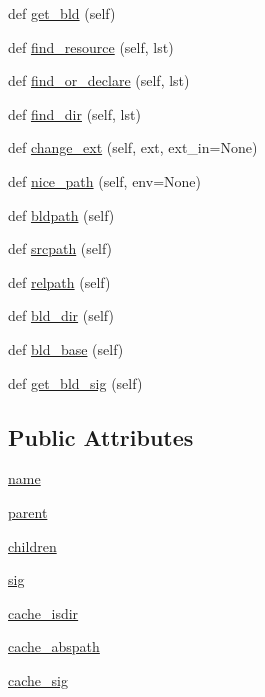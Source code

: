 \begin{DoxyCompactItemize}
\item 
def \hyperlink{classwaflib_1_1_node_1_1_node_a181e1ee8473df6b270153d1b071d4dc0}{get\+\_\+bld} (self)
\item 
def \hyperlink{classwaflib_1_1_node_1_1_node_a72b22d40cbdffb458638abb21d706ff8}{find\+\_\+resource} (self, lst)
\item 
def \hyperlink{classwaflib_1_1_node_1_1_node_aca7db00cba3cae363d3b5f689ce10828}{find\+\_\+or\+\_\+declare} (self, lst)
\item 
def \hyperlink{classwaflib_1_1_node_1_1_node_a6b0cb5708818ef6483466202ece39049}{find\+\_\+dir} (self, lst)
\item 
def \hyperlink{classwaflib_1_1_node_1_1_node_ad8e6f438a9b4e34994c8ef82c3b7649d}{change\+\_\+ext} (self, ext, ext\+\_\+in=None)
\item 
def \hyperlink{classwaflib_1_1_node_1_1_node_a84dd8d16929674c2a4dadcc078d9d314}{nice\+\_\+path} (self, env=None)
\item 
def \hyperlink{classwaflib_1_1_node_1_1_node_a1e67abe7b66ef0abd91795547e14a7b7}{bldpath} (self)
\item 
def \hyperlink{classwaflib_1_1_node_1_1_node_a135bd20c340d064fb59d2c8f329fec50}{srcpath} (self)
\item 
def \hyperlink{classwaflib_1_1_node_1_1_node_a4bc57e86dc18da4ce8fc9a669a829186}{relpath} (self)
\item 
def \hyperlink{classwaflib_1_1_node_1_1_node_ae2103a3fade78458d40298173d7179a3}{bld\+\_\+dir} (self)
\item 
def \hyperlink{classwaflib_1_1_node_1_1_node_a56b26245067bfe835f32199e74135a8a}{bld\+\_\+base} (self)
\item 
def \hyperlink{classwaflib_1_1_node_1_1_node_a804270edff72f7bc520841fa60a494e4}{get\+\_\+bld\+\_\+sig} (self)
\end{DoxyCompactItemize}
\subsection*{Public Attributes}
\begin{DoxyCompactItemize}
\item 
\hyperlink{classwaflib_1_1_node_1_1_node_ab8fdb615c47321fbc115cb2430fd3ef7}{name}
\item 
\hyperlink{classwaflib_1_1_node_1_1_node_a2136fddf4c5e98dc8d1661bee03e725c}{parent}
\item 
\hyperlink{classwaflib_1_1_node_1_1_node_a456ca8d16d54d1ac2691905cef3a7251}{children}
\item 
\hyperlink{classwaflib_1_1_node_1_1_node_aeabaa25d785f8b25cff12c30ebb2dd41}{sig}
\item 
\hyperlink{classwaflib_1_1_node_1_1_node_a341b6a4a51290cdac37aaf8f5b524d57}{cache\+\_\+isdir}
\item 
\hyperlink{classwaflib_1_1_node_1_1_node_aec46a6ec89090d2b76abe6e9f78fdd49}{cache\+\_\+abspath}
\item 
\hyperlink{classwaflib_1_1_node_1_1_node_a8045a3371ca9760acfe533744e3b4282}{cache\+\_\+sig}
\end{DoxyCompactItemize}

